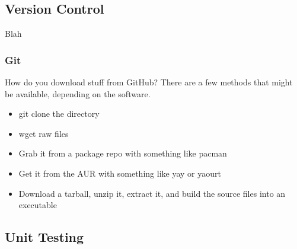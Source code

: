 





\subsection{Version Control}

Blah

\subsubsection{Git}


How do you download stuff from GitHub? There are a few methods that might be available, depending on the software.
\begin{itemize}
	\item git clone the directory
	\item wget raw files
	\item Grab it from a package repo with something like pacman
	\item Get it from the AUR with something like yay or yaourt
	\item Download a tarball, unzip it, extract it, and build the source files into an executable
\end{itemize}


\subsection{Unit Testing}

